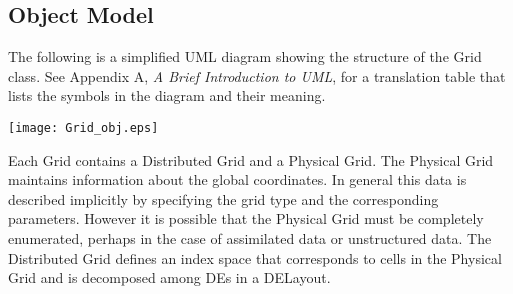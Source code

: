 %

\subsection{Object Model}

The following is a simplified UML diagram showing the structure of the
Grid class.  See Appendix A, {\it A Brief Introduction to UML},
for a translation table that lists the symbols in the diagram and their 
meaning.

\begin{center}
\texttt{[image: Grid\_obj.eps]}   
\end{center}

Each Grid contains a Distributed Grid and a Physical Grid. The Physical Grid
maintains information about the global coordinates. In general this data is
described implicitly by specifying the grid type and the corresponding
parameters. However it is possible that the Physical Grid must be completely
enumerated, perhaps in the case of assimilated data or unstructured data. The
Distributed Grid defines an index space that corresponds to cells in 
the Physical
Grid and is decomposed among DEs in a DELayout.



